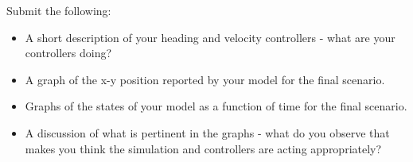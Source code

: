 \begin{ex}
Submit the following:
\begin{itemize}
\item A short description of your heading and velocity controllers - what are your controllers doing?
\item A graph of the x-y position reported by your model for the final scenario.
\item Graphs of the states of your model as a function of time for the final scenario.
\item A discussion of what is pertinent in the graphs - what do you observe that makes you think the simulation and controllers are acting appropriately?
\end{itemize}
\end{ex}





